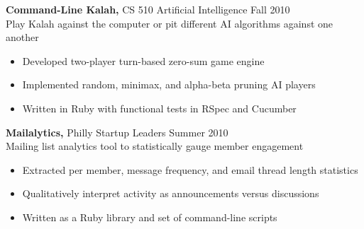 \documentclass[margin]{res}
\begin{document}
\begin{resume}

{\bf Command-Line Kalah,} CS 510 Artificial Intelligence \hfill  Fall 2010 \\
Play Kalah against the computer or pit different AI algorithms against one another
\begin{itemize} \itemsep -2pt %
\item Developed two-player turn-based zero-sum game engine
\item Implemented random, minimax, and alpha-beta pruning AI players 
\item Written in Ruby with functional tests in RSpec and Cucumber
\end{itemize}

{\bf Mailalytics,} Philly Startup Leaders \hfill  Summer 2010 \\
Mailing list analytics tool to statistically gauge member engagement
\begin{itemize} \itemsep -2pt %
\item Extracted per member, message frequency, and email thread length statistics
\item Qualitatively interpret activity as announcements versus discussions%
\item Written as a Ruby library and set of command-line scripts
\end{itemize}


\end{resume}
\end{document}
